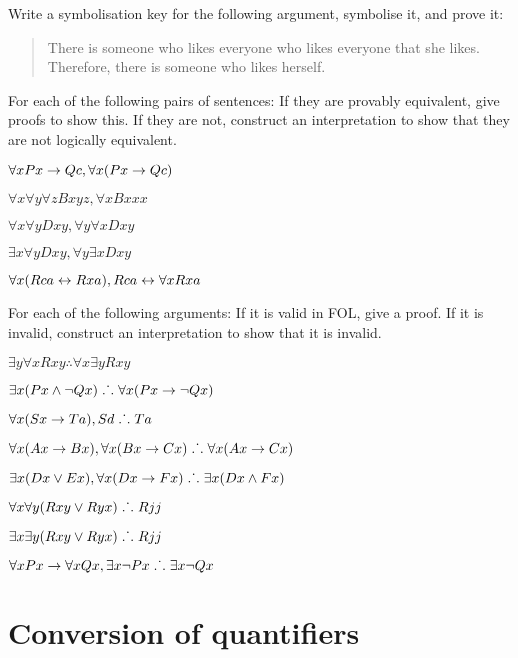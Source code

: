 \solutions
\problempart
\label{pr.likes}
Write a symbolisation key for the following argument, symbolise it, and prove it:
\begin{quote}
There is someone who likes everyone who likes everyone that she likes. Therefore, there is someone who likes herself.
\end{quote}

\solutions
\problempart
\label{pr.FOLequivornot}
For each of the following pairs of sentences: If they are provably equivalent, give proofs to show this. If they are not, construct an interpretation to show that they are not logically equivalent.
\begin{earg}
\item $\forall x Px \rightarrow Qc, \forall x (Px \rightarrow Qc)$
\item $\forall x\forall y \forall z Bxyz, \forall x Bxxx$
\item $\forall x\forall y Dxy, \forall y\forall x Dxy$
\item $\exists x\forall y Dxy, \forall y\exists x Dxy$
\item $\forall x (Rca \leftrightarrow Rxa), Rca \leftrightarrow \forall x Rxa$
\end{earg}

\solutions
\problempart
\label{pr.FOLvalidornot}
For each of the following arguments: If it is valid in FOL, give a proof. If it is invalid, construct an interpretation to show that it is invalid.
\begin{earg}
\item $\exists y\forall x Rxy \therefore \forall x\exists y Rxy$
\item $\exists x(Px \wedge \neg Qx) \mathrel{\ldotp\dot{}\,\ldotp} \forall x(Px \rightarrow \neg Qx)$
\item $\forall x(Sx \rightarrow Ta), Sd \mathrel{\ldotp\dot{}\,\ldotp} Ta$
\item $\forall x(Ax\rightarrow Bx), \forall x(Bx \rightarrow Cx) \mathrel{\ldotp\dot{}\,\ldotp} \forall x(Ax \rightarrow Cx)$
\item $\exists x(Dx \vee Ex), \forall x(Dx \rightarrow Fx) \mathrel{\ldotp\dot{}\,\ldotp} \exists x(Dx \wedge Fx)$
\item $\forall x\forall y(Rxy \vee Ryx) \mathrel{\ldotp\dot{}\,\ldotp} Rjj$
\item $\exists x\exists y(Rxy \vee Ryx) \mathrel{\ldotp\dot{}\,\ldotp} Rjj$
\item $\forall x Px \rightarrow \forall x Qx, \exists x \neg Px \mathrel{\ldotp\dot{}\,\ldotp} \exists x \neg Qx$
\end{earg}


\chapter{Conversion of quantifiers}\label{s:CQ}

